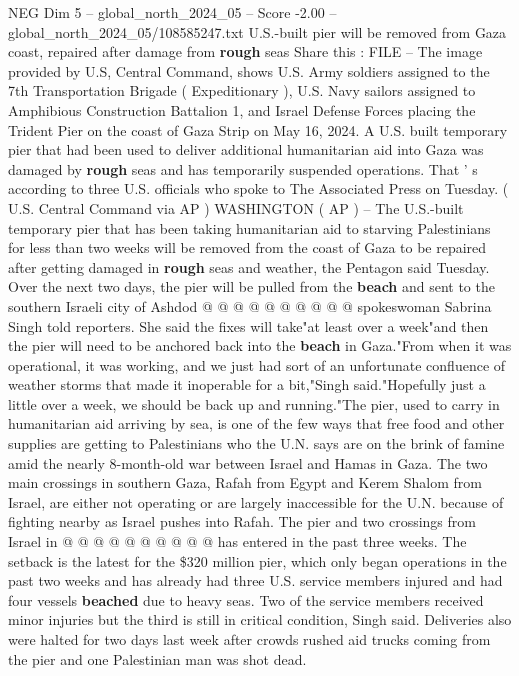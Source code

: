 \begin{textsample}{NEG Dim 5 – global\_north\_2024\_05 – Score -2.00 – global\_north\_2024\_05/108585247.txt}  \label{ex:f5_neg_281}
U.S.-built pier will be removed from Gaza coast, repaired after damage from \textbf{rough} seas Share this : FILE -- The image provided by U.S, Central Command, shows U.S.
Army soldiers assigned to the 7th Transportation Brigade ( Expeditionary ), U.S.
Navy sailors assigned to Amphibious Construction Battalion 1, and Israel Defense Forces placing the Trident Pier on the coast of Gaza Strip on May 16, 2024.
A U.S. built temporary pier that had been used to deliver additional humanitarian aid into Gaza was damaged by \textbf{rough} seas and has temporarily suspended operations.
That ' s according to three U.S. officials who spoke to The Associated Press on Tuesday. ( U.S.
Central Command via AP ) WASHINGTON ( AP ) -- The U.S.-built temporary pier that has been taking humanitarian aid to starving Palestinians for less than two weeks will be removed from the coast of Gaza to be repaired after getting damaged in \textbf{rough} seas and weather, the Pentagon said Tuesday.
Over the next two days, the pier will be pulled from the \textbf{beach} and sent to the southern Israeli city of Ashdod @ @ @ @ @ @ @ @ @ @ spokeswoman Sabrina Singh told reporters.
She said the fixes will take"at least over a week"and then the pier will need to be anchored back into the \textbf{beach} in Gaza."From when it was operational, it was working, and we just had sort of an unfortunate confluence of weather storms that made it inoperable for a bit,"Singh said."Hopefully just a little over a week, we should be back up and running."The pier, used to carry in humanitarian aid arriving by sea, is one of the few ways that free food and other supplies are getting to Palestinians who the U.N. says are on the brink of famine amid the nearly 8-month-old war between Israel and Hamas in Gaza.
The two main crossings in southern Gaza, Rafah from Egypt and Kerem Shalom from Israel, are either not operating or are largely inaccessible for the U.N. because of fighting nearby as Israel pushes into Rafah.
The pier and two crossings from Israel in @ @ @ @ @ @ @ @ @ @ has entered in the past three weeks.
The setback is the latest for the \$320 million pier, which only began operations in the past two weeks and has already had three U.S. service members injured and had four vessels \textbf{beached} due to heavy seas.
Two of the service members received minor injuries but the third is still in critical condition, Singh said.
Deliveries also were halted for two days last week after crowds rushed aid trucks coming from the pier and one Palestinian man was shot dead.

\end{textsample}

